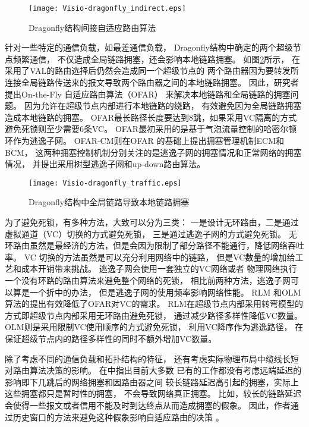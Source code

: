 \begin{figure}[htp]
  \centering
    \texttt{[image: Visio-dragonfly\_indirect.eps]}
    \caption{Dragonfly结构间接自适应路由算法}
       \label{dragonflyir}
\end{figure}

针对一些特定的通信负载，如最差通信负载，
Dragonfly结构中确定的两个超级节点频繁通信，
不仅造成全局链路拥塞，还会影响本地链路拥塞。
如图\ref{dragonflytr}所示，
在采用了VAL的路由选择后仍然会造成同一个超级节点的
两个路由器因为要转发所连接全局链路传送来的报文导致两个路由器之间的本地链路拥塞。
因此，研究者提出On-the-Fly 自适应路由算法（OFAR）
来解决本地链路和全局链路的拥塞问题。
因为允许在超级节点内部进行本地链路的绕路，
有效避免因为全局链路拥塞造成本地链路的拥塞。
OFAR最长路径长度要达到8跳，如果采用VC隔离的方式避免死锁则至少需要6条VC。
OFAR最初采用的是基于气泡流量控制的哈密尔顿环作为逃逸子网。
OFAR-CM则在OFAR 的基础上提出拥塞管理机制ECM和BCM，
这两种拥塞控制机制分别关注的是逃逸子网的拥塞情况和正常网络的拥塞情况，
并提出采用树型逃逸子网和up-down路由算法。

\begin{figure}[htp]
  \centering
    \texttt{[image: Visio-dragonfly\_traffic.eps]}
    \caption{Dragonfly结构中全局链路导致本地链路拥塞}
       \label{dragonflytr}
\end{figure}

为了避免死锁，有多种方法，大致可以分为三类：
一是设计无环路由，二是通过虚拟通道（VC）切换的方式避免死锁，
三是通过逃逸子网的方式避免死锁。
无环路由虽然是最经济的方法，但是会因为限制了部分路径不能通行，降低网络吞吐率。
VC 切换的方法虽然是可以充分利用网络中的链路，
但是VC数量的增加给工艺和成本开销带来挑战。
逃逸子网会使用一套独立的VC网络或者
物理网络执行一个没有环路的路由算法来避免整个网络的死锁，
相比前两种方法，逃逸子网可以算是一个折中的办法，
但是逃逸子网的使用频率影响网络性能。
RLM 和OLM算法的提出有效降低了OFAR对VC的需求。
RLM在超级节点内部采用转弯模型的方式即超级节点内部采用无环路由避免死锁，
通过减少路径多样性降低VC数量。
OLM则是采用限制VC使用顺序的方式避免死锁，
利用VC降序作为逃逸路径，
在保证超级节点内的路径多样性的同时不额外增加VC数量。

除了考虑不同的通信负载和拓扑结构的特征，
还有考虑实际物理布局中缆线长短对路由算法决策的影响。
在中指出目前大多数
已有的工作都没有考虑远端延迟的影响即下几跳后的网络拥塞和因路由器之间
较长链路延迟高引起的拥塞，实际上这些拥塞都只是暂时性的拥塞，
不会导致网络真正拥塞。
比如，较长的链路延迟会使得一些报文或者信用不能及时到达终点从而造成拥塞的假象。
因此，作者通过历史窗口的方法来避免这种假象影响自适应路由的决策
。

